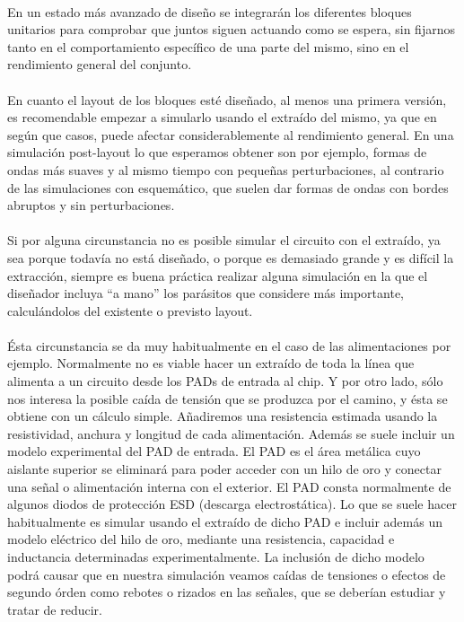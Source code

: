 \paragraph{}
En un estado más avanzado de diseño se integrarán los diferentes bloques unitarios
para comprobar que juntos siguen actuando como se espera, sin fijarnos tanto en el
comportamiento específico de una parte del mismo, sino en el rendimiento general del
conjunto.

\paragraph{}
En cuanto el layout de los bloques esté diseñado, al menos una primera versión, es
recomendable empezar a simularlo usando el extraído del mismo, ya que en según que
casos, puede afectar considerablemente al rendimiento general. En una simulación
post-layout lo que esperamos obtener son por ejemplo, formas de ondas más suaves
y al mismo tiempo con pequeñas perturbaciones, al contrario de las simulaciones
con esquemático, que suelen dar formas de ondas con bordes abruptos y sin perturbaciones.

\paragraph{}
Si por alguna circunstancia no es posible simular el circuito con el extraído, ya
sea porque todavía no está diseñado, o porque es demasiado grande y es difícil
la extracción, siempre es buena práctica realizar alguna simulación en la que el
diseñador incluya ``a mano'' los parásitos que considere más importante,
calculándolos del existente o previsto layout.

\paragraph{}
Ésta circunstancia se da muy habitualmente en el caso de las alimentaciones por ejemplo.
Normalmente no es viable hacer un extraído de toda la línea que alimenta a un circuito
desde los PADs de entrada al chip. Y por otro lado, sólo nos interesa la posible
caída de tensión que se produzca por el camino, y ésta se obtiene con un cálculo
simple. Añadiremos una resistencia estimada usando la resistividad, anchura y longitud
de cada alimentación. Además se suele incluir un modelo experimental del PAD de entrada.
El PAD es el área metálica cuyo aislante superior se eliminará para poder acceder
con un hilo de oro y conectar una señal o alimentación interna con el exterior.
El PAD consta normalmente de algunos diodos de protección ESD (descarga electrostática).
Lo que se suele hacer habitualmente es simular usando el extraído de dicho PAD e
incluir además un modelo eléctrico del hilo de oro, mediante una resistencia,
capacidad e inductancia determinadas experimentalmente. La inclusión de dicho modelo
podrá causar que en nuestra simulación veamos caídas de tensiones o efectos de
segundo órden como rebotes o rizados en las señales, que se deberían estudiar y
tratar de reducir.

